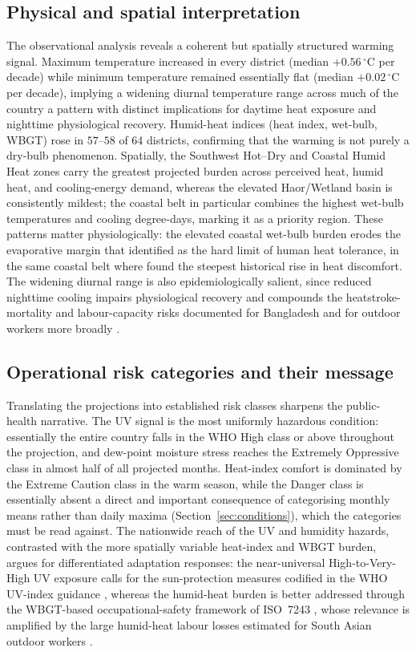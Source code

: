 \documentclass[review,11pt]{elsarticle}
\newcommand{\degC}{\ensuremath{^{\circ}\mathrm{C}}}
\begin{document}
\subsection{Physical and spatial interpretation}
The observational analysis reveals a coherent but spatially structured warming
signal. Maximum temperature increased in every district (median $+0.56\,\degC$
per decade) while minimum temperature remained essentially flat (median
$+0.02\,\degC$ per decade), implying a widening diurnal temperature range across
much of the country a pattern with distinct implications for daytime heat
exposure and nighttime physiological recovery. Humid-heat indices (heat index,
wet-bulb, WBGT) rose in $57$--$58$ of 64 districts, confirming that the warming is
not purely a dry-bulb phenomenon. Spatially, the Southwest Hot--Dry and Coastal
Humid Heat zones carry the greatest projected burden across perceived heat,
humid heat, and cooling-energy demand, whereas the elevated Haor/Wetland basin is
consistently mildest; the coastal belt in particular combines the highest
wet-bulb temperatures and cooling degree-days, marking it as a priority region.
These patterns matter physiologically: the elevated coastal wet-bulb burden erodes
the evaporative margin that \citet{raymond2020} identified as the hard limit of
human heat tolerance, in the same coastal belt where \citet{tanim2024heat} found
the steepest historical rise in heat discomfort. The widening diurnal range is also
epidemiologically salient, since reduced nighttime cooling impairs physiological
recovery and compounds the heatstroke-mortality and labour-capacity risks
documented for Bangladesh and for outdoor workers more broadly
\citep{miah2026,flouris2022}.

\subsection{Operational risk categories and their message}
Translating the projections into established risk classes sharpens the
public-health narrative. The UV signal is the most uniformly hazardous condition:
essentially the entire country falls in the WHO High class or above throughout the
projection, and dew-point moisture stress reaches the Extremely Oppressive class
in almost half of all projected months. Heat-index comfort is dominated by the
Extreme Caution class in the warm season, while the Danger class is essentially
absent a direct and important consequence of categorising monthly means rather
than daily maxima (Section~\ref{sec:conditions}), which the categories must be
read against. The nationwide reach of the UV and humidity hazards, contrasted with
the more spatially variable heat-index and WBGT burden, argues for differentiated
adaptation responses: the near-universal High-to-Very-High UV exposure calls for
the sun-protection measures codified in the WHO UV-index guidance \citep{who2002},
whereas the humid-heat burden is better addressed through the WBGT-based
occupational-safety framework of ISO~7243 \citep{iso7243_2017,parsons2006}, whose
relevance is amplified by the large humid-heat labour losses estimated for South
Asian outdoor workers \citep{parsons2021labor}.
\end{document}

